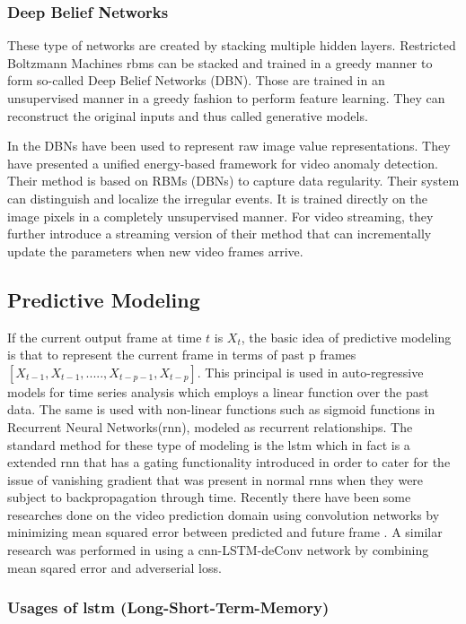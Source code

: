 \documentclass[a4paper,12pt]{report}
\begin{document}
\begin{itemize}
\subsubsection{Deep Belief Networks}

These type of networks are created by stacking multiple hidden layers. Restricted Boltzmann Machines \gls{rbm}s can be stacked and trained in a greedy manner to form so-called Deep Belief Networks (DBN). Those are trained in an unsupervised manner in a greedy fashion to perform feature learning. They can reconstruct the original inputs and thus called generative models. 

In \cite{44} the DBNs have been used to represent raw image value representations. 
They have presented a uniﬁed energy-based framework for video anomaly detection. Their  method is based on RBMs (DBNs) to capture data regularity. Their system can distinguish and localize the irregular events. It is trained directly on the image pixels in a completely unsupervised manner. For video streaming, they further introduce a streaming version of their method that can incrementally update the parameters when new video frames arrive.

\subsection{Predictive Modeling}

If the current output frame at time $t$  is $X_t$, the basic idea of predictive modeling is that to represent the current frame in terms of past p frames $[X_{t-1},X_{t-1},.....,X_{t-p-1},X_{t-p}]$. This principal is used in  auto-regressive models for time series analysis which employs a linear function over the past data. The same is used with non-linear functions such as sigmoid functions in Recurrent Neural Networks(\gls{rnn}), modeled as recurrent relationships. The standard method for these type of modeling is the \gls{lstm} which in fact is a extended \gls{rnn} that has a gating functionality introduced in order to cater for the issue of vanishing gradient that was present in normal \gls{rnn}s when they were subject to backpropagation through time.
Recently there have been some researches done on the video prediction domain using convolution networks by minimizing mean squared error between predicted and future frame \cite{6}. A similar research was performed in \cite{50} using a \gls{cnn}-LSTM-deConv network by combining mean sqared error and adverserial loss.

\subsubsection{Usages of \gls{lstm} (Long-Short-Term-Memory)}


\end{itemize}
\end{document}
